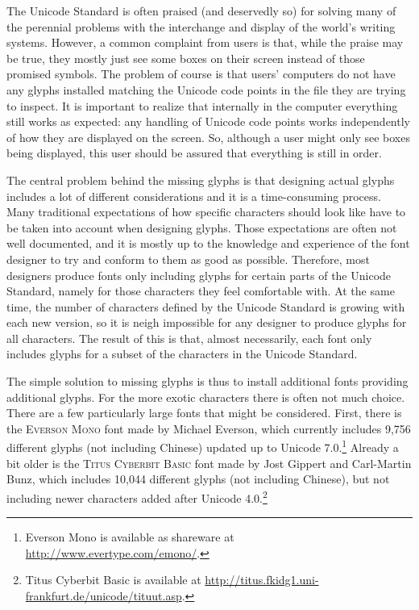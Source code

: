 The Unicode Standard is often praised (and deservedly so) for solving many of
the perennial problems with the interchange and display of the world's writing
systems. However, a common complaint from users is that, while the praise may be
true, they mostly just see some boxes on their screen instead of those promised
symbols. The problem of course is that users' computers do not have any glyphs
installed matching the Unicode code points in the file they are trying to
inspect. It is important to realize that internally in the computer everything
still works as expected: any handling of Unicode code points works independently
of how they are displayed on the screen. So, although a user might only see
boxes being displayed, this user should be assured that everything is still in
order.

The central problem behind the missing glyphs is that designing actual glyphs
includes a lot of different considerations and it is a time-consuming process.
Many traditional expectations of how specific characters should look like have
to be taken into account when designing glyphs. Those expectations are often not
well documented, and it is mostly up to the knowledge and experience of the font
designer to try and conform to them as good as possible. Therefore, most
designers produce fonts only including glyphs for certain parts of the Unicode
Standard, namely for those characters they feel comfortable with. At the same
time, the number of characters defined by the Unicode Standard is growing with
each new version, so it is neigh impossible for any designer to produce glyphs
for all characters. The result of this is that, almost necessarily, each font
only includes glyphs for a subset of the characters in the Unicode Standard.

The simple solution to missing glyphs is thus to install additional fonts
providing additional glyphs. For the more exotic characters there is often not
much choice. There are a few particularly large fonts that might be considered.
First, there is the \textsc{Everson Mono} font made by Michael Everson, which
currently includes 9,756 different glyphs (not including Chinese) updated up to
Unicode 7.0.\footnote{Everson Mono is available as shareware at
\url{http://www.evertype.com/emono/}.} Already a bit older is the \textsc{Titus
Cyberbit Basic} font made by Jost Gippert and Carl-Martin Bunz, which includes
10,044 different glyphs (not including Chinese), but not including newer
characters added after Unicode 4.0.\footnote{Titus Cyberbit Basic is available
at \url{http://titus.fkidg1.uni-frankfurt.de/unicode/tituut.asp}.}

